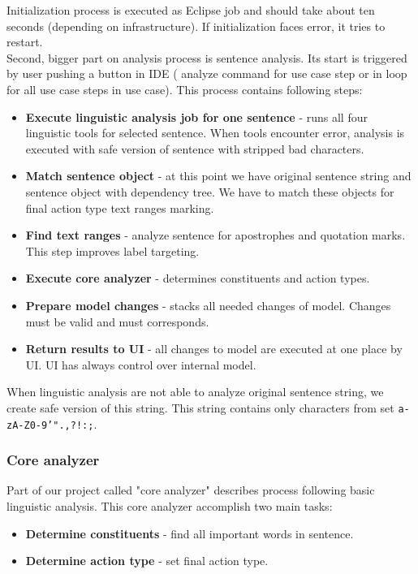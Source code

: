 Initialization process is executed as Eclipse job and should take about ten seconds (depending on infrastructure). If initialization faces error, it tries to restart.\\

Second, bigger part on analysis process is sentence analysis. Its start is triggered by user pushing a button in IDE ( analyze command for use case step or in loop for all use case steps in use case). This process contains following steps:

\begin{itemize}
\item {\bf Execute linguistic analysis job for one sentence} - runs all four linguistic tools for selected sentence. When tools encounter error, analysis is executed with safe version of sentence with stripped bad characters. 
\item {\bf Match sentence object} - at this point we have original sentence string and sentence object with dependency tree. We have to match these objects for final action type text ranges marking.
\item {\bf Find text ranges} - analyze sentence for apostrophes and quotation marks. This step improves label targeting.
\item {\bf Execute core analyzer} - determines constituents and action types.
\item {\bf Prepare model changes} - stacks all needed changes of model. Changes must be valid and must corresponds.
\item {\bf Return results to UI} - all changes to model are executed at one place by UI. UI has always control over internal model.
\end{itemize}

When linguistic analysis are not able to analyze original sentence string, we create safe version of this string. This string contains only characters from set {\tt a-zA-Z0-9'".,?!:;}.

\subsubsection{Core analyzer}
Part of our project called "core analyzer" describes process following basic linguistic analysis. This core analyzer accomplish two main tasks:

\begin{itemize}
\item {\bf Determine constituents} - find all important words in sentence.
\item {\bf Determine action type} - set final action type.
\end{itemize}

